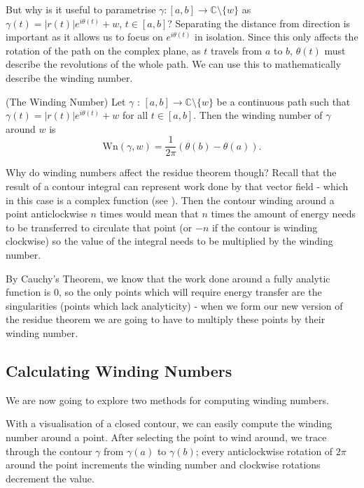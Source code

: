 \documentclass[a4paper]{article}
\def\Wind{\text{Wn}}
\begin{document}
But why is it useful to parametrise $\gamma: [a,b] \rightarrow \mathbb{C}\setminus\{w\}$ as $\gamma(t) = |r(t)|e^{i\theta(t)}+w$, $t \in [a,b]$? Separating the distance from direction is important as it allows us to focus on $e^{i\theta(t)}$ in isolation. Since this only affects the rotation of the path on the complex plane, as $t$ travels from $a$ to $b$, $\theta(t)$ must describe the revolutions of the whole path. We can use this to mathematically describe the winding number.

\begin{definition}{(The Winding Number) \citep[p.30]{Roe}}{}
Let $\gamma$ : $[a,b] \rightarrow \mathbb{C}\setminus\{w\}$ be a continuous path such that $\gamma(t) = |r(t)|e^{i\theta(t)} + w$ for all $ t \in [a,b]$. Then the winding number of $\gamma$ around $w$ is
\[ \Wind(\gamma,w)   = \frac{1}{2\pi}(\theta(b) - \theta(a)). \] 

\end{definition}

Why do winding numbers affect the residue theorem though? Recall that the result of a contour integral can represent work done by that vector field - which in this case is a complex function (see \citep[p.474-476]{Needham}). Then the contour winding around a point anticlockwise $n$ times would mean that $n$ times the amount of energy needs to be transferred to circulate that point (or $-n$ if the contour is winding clockwise) so the value of the integral needs to be multiplied by the winding number. 

By Cauchy's Theorem, we know that the work done around a fully analytic function is $0$, so the only points which will require energy transfer are the singularities (points which lack analyticity) - when we form our new version of the residue theorem we are going to have to multiply these points by their winding number.


\subsection{Calculating Winding Numbers}

We are now going to explore two methods for computing winding numbers.

With a visualisation of a closed contour, we can easily compute the winding number around a point. After selecting the point to wind around, we trace through the contour $\gamma$ from $\gamma(a)$ to $\gamma(b)$; every anticlockwise rotation of $2\pi$ around the point increments the winding number and clockwise rotations decrement the value. 
\end{document}
